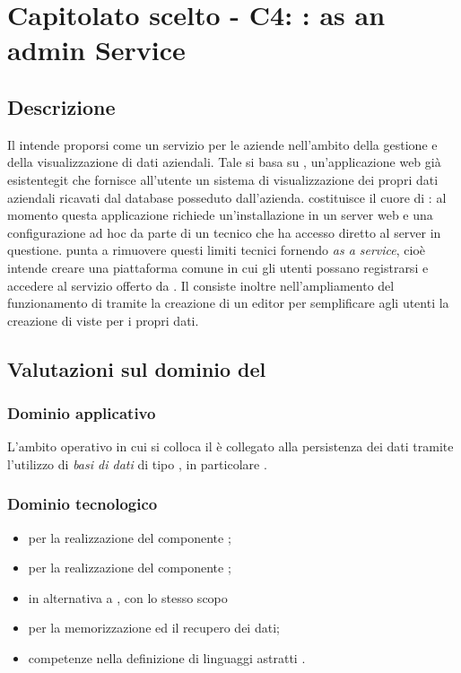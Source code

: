 \section{Capitolato scelto - C4: :  as an admin Service}
\subsection{Descrizione}
Il   intende proporsi come un servizio per le aziende nell'ambito della gestione e della visualizzazione di dati aziendali. 
Tale  si basa su , un'applicazione web gi\`a esistentegit  che fornisce all'utente un sistema di visualizzazione
dei propri dati aziendali ricavati dal database  posseduto dall'azienda.
 costituisce il cuore di : al momento questa applicazione richiede un'installazione in un server web e 
una configurazione ad hoc da parte di un tecnico che ha accesso diretto al server in questione.  punta a rimuovere 
questi limiti tecnici fornendo  \textit{as a service}, cioè intende creare una piattaforma comune in cui gli utenti possano 
registrarsi e accedere al servizio offerto da . Il  consiste inoltre nell'ampliamento del funzionamento di  tramite la creazione di 
un editor per semplificare agli utenti la creazione di viste per i propri dati.


\subsection{Valutazioni sul dominio del }
\subsubsection{Dominio applicativo}
L'ambito operativo in cui si colloca il  \`e collegato alla persistenza dei dati tramite l'utilizzo
di \textit{basi di dati} di tipo , in particolare .

\subsubsection{Dominio tecnologico}
\begin{itemize}
\item {} per la realizzazione del componente ;
\item {} per la realizzazione del componente ;
\item {} in alternativa a , con lo stesso scopo
\item {} per la memorizzazione ed il recupero dei dati;
\item competenze nella definizione di linguaggi astratti .
\end{itemize}


